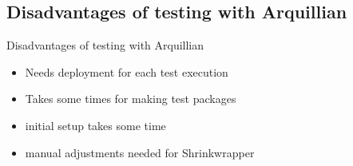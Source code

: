 \subsection{Disadvantages of testing with Arquillian}
\begin{frame}{Disadvantages of testing with  Arquillian}
\begin{itemize}
\item Needs deployment for each test execution
\item Takes some times for making test packages
\item initial setup takes some time
\item manual adjustments needed for Shrinkwrapper
\end{itemize}
\end{frame}
